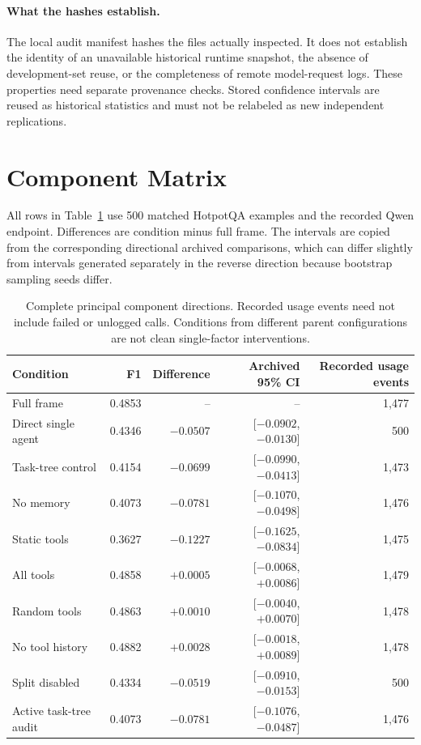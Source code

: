 \documentclass[sigconf,anonymous]{aamas}
\begin{document}
\paragraph{What the hashes establish.}
The local audit manifest hashes the files actually inspected. It does not establish the identity of an unavailable historical runtime snapshot, the absence of development-set reuse, or the completeness of remote model-request logs. These properties need separate provenance checks. Stored confidence intervals are reused as historical statistics and must not be relabeled as new independent replications.

\section{Component Matrix}

All rows in Table~\ref{tab:fullcomponents} use 500 matched HotpotQA examples and the recorded Qwen endpoint. Differences are condition minus full frame. The intervals are copied from the corresponding directional archived comparisons, which can differ slightly from intervals generated separately in the reverse direction because bootstrap sampling seeds differ.

\begin{table}[t]
\centering
\begin{tabular}{lrrrr}
\toprule
Condition & F1 & Difference & Archived 95\% CI & Recorded usage events \\
\midrule
Full frame & 0.4853 & -- & -- & 1,477 \\
Direct single agent & 0.4346 & $-0.0507$ & [$-0.0902$, $-0.0130$] & 500 \\
Task-tree control & 0.4154 & $-0.0699$ & [$-0.0990$, $-0.0413$] & 1,473 \\
No memory & 0.4073 & $-0.0781$ & [$-0.1070$, $-0.0498$] & 1,476 \\
Static tools & 0.3627 & $-0.1227$ & [$-0.1625$, $-0.0834$] & 1,475 \\
All tools & 0.4858 & $+0.0005$ & [$-0.0068$, $+0.0086$] & 1,479 \\
Random tools & 0.4863 & $+0.0010$ & [$-0.0040$, $+0.0070$] & 1,478 \\
No tool history & 0.4882 & $+0.0028$ & [$-0.0018$, $+0.0089$] & 1,478 \\
Split disabled & 0.4334 & $-0.0519$ & [$-0.0910$, $-0.0153$] & 500 \\
Active task-tree audit & 0.4073 & $-0.0781$ & [$-0.1076$, $-0.0487$] & 1,476 \\
\bottomrule
\end{tabular}
\caption{Complete principal component directions. Recorded usage events need not include failed or unlogged calls. Conditions from different parent configurations are not clean single-factor interventions.}
\label{tab:fullcomponents}
\end{table}
\end{document}
